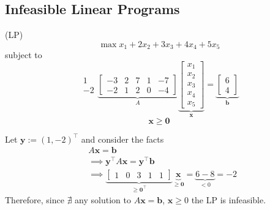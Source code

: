 \subsection{Infeasible Linear Programs}
\begin{exbox}
    \begin{example}[Infeasible LP]
        (LP)
        \[\max x_1+2x_2+3x_3+4x_4+5x_5\]
        subject to
        \[
            \begin{matrix}
                1 \\
                -2
            \end{matrix}
            \underbrace{
                \begin{bmatrix}
                    -3 & 2 & 7 & 1 & -7 \\
                    -2 & 1 & 2 & 0 & -4
                \end{bmatrix}}_{A}
            \underbrace{\begin{bmatrix}
                    x_1 \\
                    x_2 \\
                    x_3 \\
                    x_4 \\
                    x_5
                \end{bmatrix}}_{\bm{x}}
            =
            \underbrace{\begin{bmatrix}
                    6 \\
                    4
                \end{bmatrix}}_{\bm{b}}
        \]
        \[ \bm{x}\geqslant  \bm{0} \]

        Let $\bm{y}:=(1,-2)^\top$
        and consider the facts
        \begin{align*}
             & A\bm{x}=\bm{b}                                                            \\
             & \implies \bm{y}^\top A\bm{x}=\bm{y}^\top \bm{b}                           \\
             & \implies \underbrace{\begin{bmatrix}
                    1 & 0 & 3 & 1 & 1
                \end{bmatrix}}_{\geqslant  \bm{0}^\top }
            \underbrace{\bm{x}}_{\geqslant  \bm{0}}=\underbrace{6-8}_{< 0}=-2
        \end{align*}
        Therefore, since $\nexists$ any solution to $A\bm{x}=\bm{b}$, $\bm{x}\geqslant  0$
        the LP is infeasible.
    \end{example}
\end{exbox}

